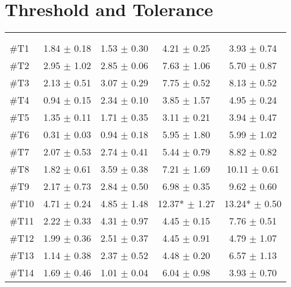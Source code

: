 \section{Threshold and Tolerance} \label{appsec:ThresTolA}
\begin{longtable} {l|c|c|c|c}
 \rowcolor[HTML]{C0C0C0} 
  \color[HTML]{000000}{} & 
 \multicolumn{2}{c|}{ \color[HTML]{000000}{\textbf{Threshold}}} & \multicolumn{2}{c}{ \color[HTML]{000000}{\textbf{Tolerance}}}  	\\  \rule{0pt}{3ex} 
  \cellcolor[HTML]{C0C0C0}{} &
 \multicolumn{1}{c|}{ \cellcolor[HTML]{C0C0C0}{Pre [KgF]}} & \multicolumn{1}{c|}{ \cellcolor[HTML]{C0C0C0}{Post [KgF]}} 
 & \multicolumn{1}{|c|}{ \cellcolor[HTML]{C0C0C0}{Pre [KgF]}} 
 & \multicolumn{1}{c|}{ \cellcolor[HTML]{C0C0C0}{Post [KgF]}} 	\\ \hline 
\#T1 & 1.84 $\pm$ 0.18 & 1.53 $\pm$ 0.30 & 4.21 $\pm$ 0.25 & 3.93 $\pm$ 0.74 \\ \hline
\#T2 & 2.95 $\pm$ 1.02 & 2.85 $\pm$ 0.06 & 7.63 $\pm$ 1.06  & 5.70 $\pm$ 0.87 \\ \hline
\#T3 & 2.13 $\pm$ 0.51 & 3.07 $\pm$ 0.29 & 7.75 $\pm$ 0.52 & 8.13 $\pm$ 0.52 \\ \hline
\#T4 & 0.94 $\pm$ 0.15 & 2.34 $\pm$ 0.10 & 3.85 $\pm$ 1.57 & 4.95 $\pm$ 0.24 \\ \hline
\#T5 & 1.35 $\pm$ 0.11 & 1.71 $\pm$ 0.35 & 3.11 $\pm$ 0.21  & 3.94 $\pm$ 0.47 \\ \hline	
\#T6 & 0.31 $\pm$ 0.03 & 0.94 $\pm$ 0.18 & 5.95 $\pm$ 1.80 & 5.99 $\pm$  1.02\\ \hline
\#T7 & 2.07 $\pm$ 0.53  & 2.74 $\pm$ 0.41 & 5.44 $\pm$ 0.79 & 8.82 $\pm$ 0.82  \\ \hline
\#T8 & 1.82 $\pm$ 0.61 & 3.59 $\pm$ 0.38 & 7.21 $\pm$ 1.69 & 10.11 $\pm$ 0.61 \\ \hline
\#T9 & 2.17 $\pm$ 0.73 & 2.84 $\pm$ 0.50 & 6.98 $\pm$  0.35 & 9.62 $\pm$ 0.60 \\ \hline
\#T10 & 4.71 $\pm$ 0.24 & 4.85 $\pm$ 1.48  & 12.37*  $\pm$ 1.27  & 13.24* $\pm$ 0.50  \\ \hline
\#T11 & 2.22 $\pm$ 0.33 & 4.31 $\pm$ 0.97 & 4.45 $\pm$ 0.15 & 7.76 $\pm$  0.51 \\ \hline
\#T12 & 1.99 $\pm$ 0.36 & 2.51 $\pm$ 0.37  & 4.45 $\pm$ 0.91  & 4.79 $\pm$ 1.07  \\ \hline
\#T13 & 1.14 $\pm$ 0.38 & 2.37 $\pm$ 0.52 & 4.48 $\pm$ 0.20 & 6.57 $\pm$ 1.13 \\ \hline
\#T14 & 1.69 $\pm$ 0.46 & 1.01 $\pm$ 0.04 & 6.04 $\pm$ 0.98 & 3.93 $\pm$ 0.70 \\ \hline

\end{longtable}
